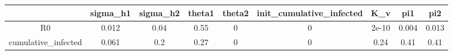 \begin{tabular}{|c|c|c|c|c|c|c|c|c|}
\hline
& sigma_h1 & sigma_h2 & theta1 & theta2 & init_cumulative_infected & K_v & pi1 & pi2 \\
\hline
R0 & 0.012 & 0.04 & 0.55 & 0 & 0 & 2e-10 & 0.004 & 0.013 \\
\hline
cumulative_infected & 0.061 & 0.2 & 0.27 & 0 & 0 & 0.24 & 0.41 & 0.41 \\
\hline
\end{tabular}
